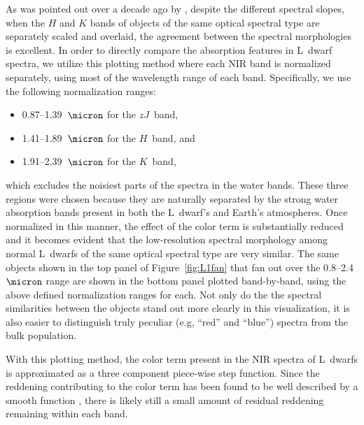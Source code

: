 \documentclass[12pt,preprint]{aastex}
\begin{document}
As was pointed out over a decade ago by \citet{Leggett:2003tm}, despite the different spectral slopes, when the $H$ and $K$ bands of objects of the same optical spectral type are separately scaled and overlaid, the agreement between the spectral morphologies is excellent.
In order to directly compare the absorption features in L~dwarf spectra, we utilize this plotting method where each NIR band is normalized separately, using most of the wavelength range of each band. 
Specifically, we use the following normalization ranges: 
\begin{itemize} \itemsep1pt \parskip0pt 
\item 0.87--1.39~$\micron$ for the $zJ$~band,
\item 1.41--1.89~$\micron$ for the $H$~band, and 
\item 1.91--2.39~$\micron$ for the $K$~band, 
\end{itemize}
which excludes the noisiest parts of the spectra in the water bands.
These three regions were chosen because they are naturally separated by the strong water absorption bands present in both the L~dwarf's and Earth's atmospheres. 
Once normalized in this manner, the effect of the color term is substantially reduced and it becomes evident that the low-resolution spectral morphology among normal L~dwarfs of the same optical spectral type are very similar. 
The same objects shown in the top panel of Figure~\ref{fig:L1fan} that fan out over the 0.8--2.4~$\micron$ range are shown in the bottom panel plotted band-by-band, using the above defined normalization ranges for each. 
Not only do the the spectral similarities between the objects stand out more clearly in this visualization, it is also easier to distinguish truly peculiar (e.g, ``red'' and ``blue'') spectra from the bulk population.

With this plotting method, the color term present in the NIR spectra of L~dwarfs is approximated as a three component piece-wise step function. Since the reddening contributing to the color term has been found to be well described by a smooth function \citep{Marocco:2014kr,Hiranaka:2015va}, there is likely still a small amount of residual reddening remaining within each band.

\end{document}
